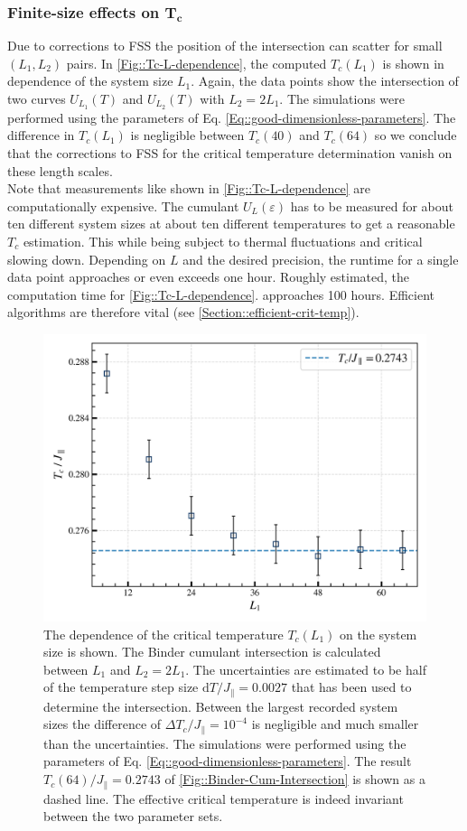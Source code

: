 	\subsubsection{Finite-size effects on $\boldsymbol{T_c}$}
	Due to corrections to FSS the position of the intersection can scatter for small $(L_1, L_2)$ pairs. In \autoref{Fig::Tc-L-dependence}, the computed $T_c(L_1)$ is shown in dependence of the system size $L_1$. Again, the data points show the intersection of two curves $U_{L_1}(T)$ and $U_{L_2}(T)$ with $L_2 =	2 L_1$. The simulations were performed using the parameters of Eq. \eqref{Eq::good-dimensionless-parameters}. The difference in $T_c(L_1)$ is negligible between $T_c(40)$ and $T_c(64)$ so we conclude that the corrections to FSS for the critical temperature determination vanish on these length scales.  \\
	
	Note that measurements like shown in \autoref{Fig::Tc-L-dependence} are computationally expensive. The cumulant $U_L(\varepsilon)$ has to be measured for about ten different system sizes at about ten different temperatures to get a reasonable $T_c$ estimation. This while being subject to thermal fluctuations and critical slowing down. Depending on $L$ and the desired precision, the runtime for a single data point approaches or even exceeds one hour.  Roughly estimated, the computation time for \autoref{Fig::Tc-L-dependence}. approaches 100 hours. Efficient algorithms are therefore vital (see \autoref{Section::efficient-crit-temp}).
	\begin{figure}[tb]
		\centering
		\includegraphics[width=0.8\linewidth]{graphics/Tc_L-5.png}
		\caption{The dependence of the critical temperature $T_c(L_1)$ on the system size is shown. The Binder cumulant intersection is calculated between $L_1$ and $L_{2} =	2 L_{1}$. The uncertainties are estimated to be half of the temperature step size $\text{d}T /	J_\parallel = 0.0027$ that has been used to determine the intersection. Between the largest recorded system sizes the difference of $\Delta T_c /	J_\parallel = 10^{-4}$ is negligible and much smaller than the uncertainties. The simulations were performed using the parameters of Eq. \eqref{Eq::good-dimensionless-parameters}. The result $T_c(64) / J_\parallel =	0.2743$ of \autoref{Fig::Binder-Cum-Intersection} is shown as a dashed line. The effective critical temperature is indeed invariant between the two parameter sets.}
		\label{Fig::Tc-L-dependence}
	\end{figure}
